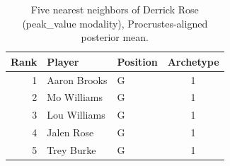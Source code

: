 \begin{table}[htbp]
  \centering\small
  \begin{tabular}{rllc}
    \toprule
    Rank & Player & Position & Archetype \\
    \midrule
    1 & Aaron Brooks & G & 1 \\
    2 & Mo Williams & G & 1 \\
    3 & Lou Williams & G & 1 \\
    4 & Jalen Rose & G & 1 \\
    5 & Trey Burke & G & 1 \\
    \bottomrule
  \end{tabular}
  \caption{Five nearest neighbors of Derrick Rose (peak_value modality), Procrustes-aligned posterior mean.}
  \label{tab:Derrick_Rose_neighbors_peak_value}
\end{table}

